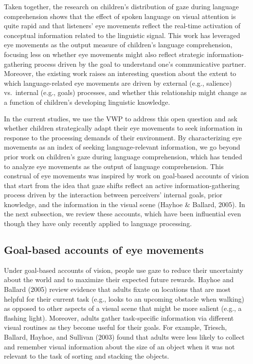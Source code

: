 \documentclass[,man,floatsintext]{apa6}
\begin{document}
Taken together, the research on children's distribution of gaze during language comprehension shows that the effect of spoken language on visual attention is quite rapid and that listeners' eye movements reflect the real-time activation of conceptual information related to the linguistic signal. This work has leveraged eye movements as the output measure of children's language comprehension, focusing less on whether eye movements might also reflect strategic information-gathering process driven by the goal to understand one's communicative partner. Moreover, the existing work raises an interesting question about the extent to which language-related eye movements are driven by external (e.g., salience) vs.~internal (e.g., goals) processes, and whether this relationship might change as a function of children's developing linguistic knowledge.

In the current studies, we use the VWP to address this open question and ask whether children strategically adapt their eye movements to seek information in response to the processing demands of their environment. By characterizing eye movements as an index of seeking language-relevant information, we go beyond prior work on children's gaze during language comprehension, which has tended to analyze eye movements as the output of language comprehension. This construal of eye movements was inspired by work on goal-based accounts of vision that start from the idea that gaze shifts reflect an active information-gathering process driven by the interaction between perceivers' internal goals, prior knowledge, and the information in the visual scene (Hayhoe \& Ballard, 2005). In the next subsection, we review these accounts, which have been influential even though they have only recently applied to language processing.

\hypertarget{goal-based-accounts-of-eye-movements}{%
\subsection{Goal-based accounts of eye movements}\label{goal-based-accounts-of-eye-movements}}

Under goal-based accounts of vision, people use gaze to reduce their uncertainty about the world and to maximize their expected future rewards. Hayhoe and Ballard (2005) review evidence that adults fixate on locations that are most helpful for their current task (e.g., looks to an upcoming obstacle when walking) as opposed to other aspects of a visual scene that might be more salient (e.g., a flashing light). Moreover, adults gather task-specific information via different visual routines as they become useful for their goals. For example, Triesch, Ballard, Hayhoe, and Sullivan (2003) found that adults were less likely to collect and remember visual information about the size of an object when it was not relevant to the task of sorting and stacking the objects.
\end{document}
